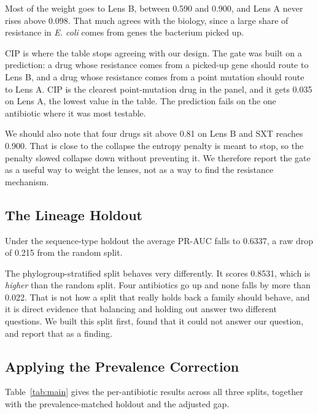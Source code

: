 \documentclass[conference]{IEEEtran}
\begin{document}
Most of the weight goes to Lens B, between 0.590 and 0.900, and Lens A never rises
above 0.098. That much agrees with the biology, since a large share of resistance in
\textit{E. coli} comes from genes the bacterium picked up.

CIP is where the table stops agreeing with our design. The gate was built on a
prediction: a drug whose resistance comes from a picked-up gene should route to Lens
B, and a drug whose resistance comes from a point mutation should route to Lens A.
CIP is the clearest point-mutation drug in the panel, and it gets 0.035 on Lens A,
the lowest value in the table. The prediction fails on the one antibiotic where it
was most testable.

We should also note that four drugs sit above 0.81 on Lens B and SXT reaches 0.900.
That is close to the collapse the entropy penalty is meant to stop, so the penalty
slowed collapse down without preventing it. We therefore report the gate as a useful
way to weight the lenses, not as a way to find the resistance mechanism.

\subsection{The Lineage Holdout}

Under the sequence-type holdout the average PR-AUC falls to 0.6337, a raw drop of
0.215 from the random split.

The phylogroup-stratified split behaves very differently. It scores 0.8531, which
is \textit{higher} than the random split. Four antibiotics go up and none falls by
more than 0.022. That is not how a split that really holds back a family should
behave, and it is direct evidence that balancing and holding out answer two
different questions. We built this split first, found that it could not answer our
question, and report that as a finding.

\subsection{Applying the Prevalence Correction}

Table~\ref{tab:main} gives the per-antibiotic results across all three splits,
together with the prevalence-matched holdout and the adjusted gap.
\end{document}
